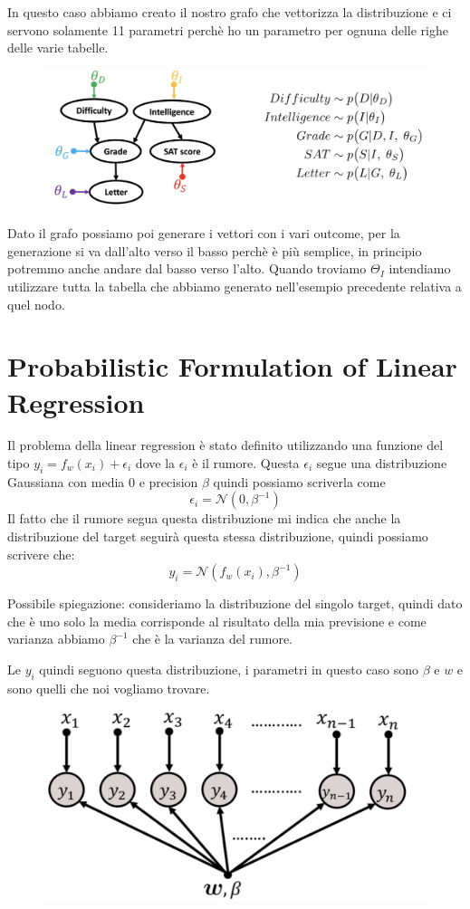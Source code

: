 \documentclass[14pt]{extreport}
\begin{document}
In questo caso abbiamo creato il nostro grafo che vettorizza la distribuzione e ci servono solamente 11 parametri perchè ho un parametro per ognuna
delle righe delle varie tabelle.

\begin{figure}[H]
\centering
\includegraphics[width=0.7\linewidth]{103.jpeg}
\end{figure}

Dato il grafo possiamo poi generare i vettori con i vari outcome, per la generazione si va dall'alto verso il basso perchè è più semplice, in
principio potremmo anche andare dal basso verso l'alto. Quando troviamo $\Theta_I$ intendiamo utilizzare tutta la tabella che abbiamo generato
nell'esempio precedente relativa a quel nodo.

\section{Probabilistic Formulation of Linear Regression}

Il problema della linear regression è stato definito utilizzando una funzione del tipo $y_i = f_w(x_i) + \epsilon_i$ dove la $\epsilon_i$ è il rumore.
Questa $\epsilon_i$ segue una distribuzione Gaussiana con media 0 e precision $\beta$ quindi possiamo scriverla come $$\epsilon_i
=\mathcal{N}(0,\beta^{-1})$$ Il fatto che il rumore segua questa distribuzione mi indica che anche la distribuzione del target seguirà questa stessa
distribuzione, quindi possiamo scrivere che: $$y_i = \mathcal{N}(f_w(x_i), \beta^{-1})$$

Possibile spiegazione: consideriamo la distribuzione del singolo target, quindi dato che è uno solo la media corrisponde al risultato della mia
previsione e come varianza abbiamo $\beta^{-1}$ che è la varianza del rumore.

Le $y_i$ quindi seguono questa distribuzione, i parametri in questo caso sono $\beta$ e $w$ e sono quelli che noi vogliamo trovare.

\begin{figure}[H]
\centering
\includegraphics[width=0.5\linewidth]{104.jpeg}
\end{figure}
\end{document}
